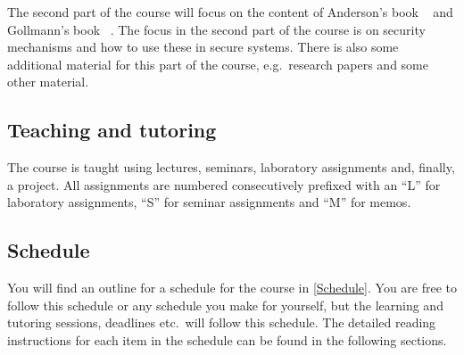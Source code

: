 The second part of the course will focus on the content of Anderson's book 
~\cite{Anderson2008sea} and Gollmann's book 
~\cite{Gollmann2011cs}.
The focus in the second part of the course is on security mechanisms and how to 
use these in secure systems.
There is also some additional material for this part of the course, e.g.\ 
research papers and some other material.

\subsection{Teaching and tutoring}

The course is taught using lectures, seminars, laboratory assignments and, 
finally, a project.
All assignments are numbered consecutively prefixed with an \enquote{L} for 
laboratory assignments, \enquote{S} for seminar assignments and \enquote{M} for 
memos.

\subsection{Schedule}

You will find an outline for a schedule for the course in \cref{Schedule}.
You are free to follow this schedule or any schedule you make for yourself, but 
the learning and tutoring sessions, deadlines etc.\ will follow this schedule.
The detailed reading instructions for each item in the schedule can be found in 
the following sections.

